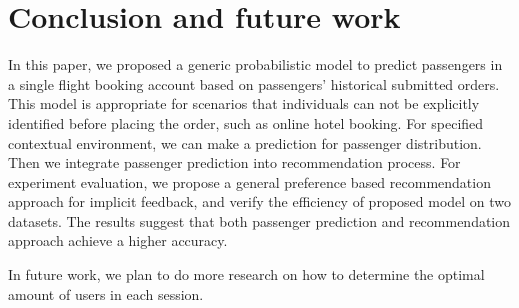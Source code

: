\documentclass{llncs}
\begin{document}
\section{Conclusion and future work}
\label{sec:con}
In this paper, we proposed a generic probabilistic model to predict passengers in a single flight booking account based on passengers' historical submitted orders. This model is appropriate for scenarios that individuals can not be explicitly identified before placing the order, such as online hotel booking. For specified contextual environment, we can make a prediction for passenger distribution. Then we integrate passenger prediction into recommendation process. For experiment evaluation, we propose a general preference based recommendation approach for implicit feedback, and verify the efficiency of proposed model on two datasets. The results suggest that both passenger prediction and recommendation approach achieve a higher accuracy. \par
In future work, we plan to do more research on how to determine the optimal amount of users in each session. 
\end{document}
